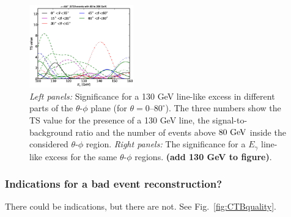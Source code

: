 \documentclass[aps,twocolumn,prd,superscriptaddress,showpacs,nofootinbib,fixfloat]{revtex4}
\newcommand{\GeV}{{\rm ~GeV}}
\begin{document}
\begin{figure}[p]
  \includegraphics[width=0.40\textwidth]{plots/scan_z.LE.100.eps}
  \caption{\emph{Left panels:} Significance for a 130 GeV line-like excess in different parts of
  the $\theta$-$\phi$ plane (for $\theta=0$--$80^\circ$). The three numbers
  show the TS value for the presence of a 130 GeV line, the
  signal-to-background ratio and the number of events above $80\GeV$ inside
  the considered $\theta$-$\phi$ region. \emph{Right panels:} The significance
  for a $E_\gamma$ line-like excess for the same $\theta$-$\phi$ regions.
  \textbf{(add 130 GeV to figure)}.}
  \label{fig:polarPlotsAll}
\end{figure}

\subsubsection{Indications for a bad event reconstruction?}
There could be indications, but there are not. See Fig.~\ref{fig:CTBquality}.
\text
\end{document}
